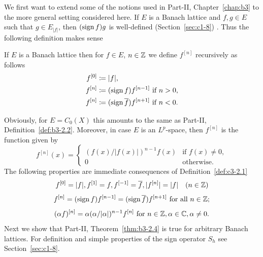 We first want to extend some of the notions used in Part-II, Chapter~\ref{chap:b3} to the more general setting considered here.
If\/ $E$ is a Banach lattice and $f,g \in E$ such that $g \in E_{|f|}$, then $(\operatorname{sign}  f)g$ is well-defined (\cf Section~\ref{sec:c1-8})%
.
Thus the following definition makes sense
\begin{definition}\label{def:c3-2.1}
	If\/ $E$ is a Banach lattice then for $f \in E$, $n \in \mathbb{Z}$ we define $f^{[n]}$ recursively as follows
	\begin{equation}\label{eq:c3-2.1}
	\begin{split}
		f^{[0]} &\coloneq |f| ,  \\
		f^{[n]} &\coloneq (\operatorname{sign}  f)f^{[n-1]} \text{ if } n > 0 , \\
		f^{[n]} &\coloneq (\operatorname{sign}  \overline{f})f^{[n+1]} \text{ if } n < 0 .
	\end{split}
	\end{equation}
\end{definition}
Obviously, for $E = C_{0}(X)$ this amounts to the same as Part-II, Definition~\ref{def:b3-2.2}.
Moreover, in case $E$ is an $L^p$-space, then $f^{[n]}$ is the function given by
\begin{equation}\label{eq:c3-2.2}
	f^{[n]}(x) = \begin{cases}
		(f(x)/|f(x)|)^{n-1}f(x) & \text{if } f(x) \neq 0 ,  \\
		0 & \text{otherwise}.
	\end{cases}
\end{equation}
The following properties are immediate consequences of Definition~\ref{def:c3-2.1}
\begin{equation}\label{eq:c3-2.3}
	f^{[0]} = |f|, f^{[1]} = f, f^{[-1]} = \overline{f}, |f^{[n]}| = |f| \quad (n \in \mathbb{Z})
\end{equation}
\begin{equation}\label{eq:c3-2.4}
	f^{[n]} = (\operatorname{sign}  f)f^{[n-1]} = (\operatorname{sign}  \overline{f})f^{[n+1]} \text{ for all } n \in \mathbb{Z};
\end{equation}
\begin{equation}\label{eq:c3-2.5}
	(\alpha f)^{[n]} = \alpha(\alpha/|\alpha|)^{n-1}f^{[n]} \text{ for } n \in \mathbb{Z}, \alpha \in \mathbb{C} , \alpha \neq 0.
\end{equation}
Next we show that Part-II, Theorem~\ref{thm:b3-2.4} is true for arbitrary Banach lattices.
For definition and simple properties of the sign operator $S_{h}$ see Section~\ref{sec:c1-8}.

